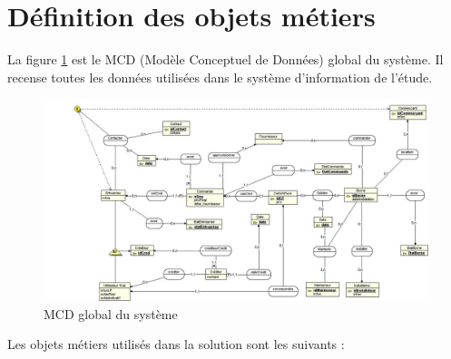 
\usepackage{rotating}




\section{Définition des objets métiers}

La figure \ref{fig:mcd} est le MCD (Modèle Conceptuel de Données) global du
système. Il recense toutes les données utilisées dans le système d'information
de l'étude.

\begin{figure}
    \centering
    \includegraphics[width=\textheight]{mcd}
    \caption{MCD global du système}
    \label{fig:mcd}
\end{figure}

Les objets métiers utilisés dans la solution sont les suivants : \\

